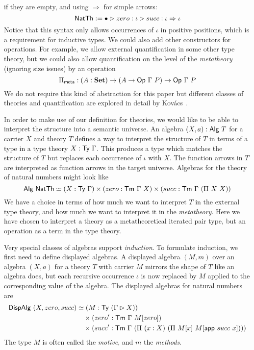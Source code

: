 if they are empty, and using $\Rightarrow$ for simple arrows:
\[
\textsf{NatTh} := \bullet \rhd zero : \iota \rhd succ : \iota \Rightarrow \iota
\]
Notice that this syntax only allows occurrences of $\iota$ in positive
positions, which is a requirement for inductive types.
We could also add other constructors for operations. For example, we allow
external quantification in some other type theory, but we could also allow quantification
on the level of the \emph{metatheory} (ignoring size issues) by an operation
\[
\Pi_{\textsf{meta}} : (A : \mathbf{Set}) \to (A \to \textsf{Op}\ \Gamma\ P) \to \textsf{Op}\ \Gamma\ P
\]
We do not require this kind of abstraction for this paper but different classes of
theories and quantification are explored in detail by Kov\'acs \cite{Kovacs2023-gq}.

In order to make use of our definition for theories, we would like to be able to interpret
the structure into a semantic universe. An algebra $(X, a) : \textsf{Alg}\ T$
for a carrier $X$ and theory $T$ defines a way to interpret the structure of $T$
in terms of a type in a type theory $X : \textsf{Ty}\ \Gamma$. This produces a type which
matches the structure of $T$ but replaces each occurrence of $\iota$ with $X$.
The function arrows in $T$ are interpreted as function arrows in the target universe.
Algebras for the theory of natural numbers might look like
\[
	\mta{Alg}\ \mta{NatTh}\simeq (X : \Ty\ \Gamma) \times (zero : \Tm\ \Gamma\ X) \times (succ : \Tm\ \Gamma\ (\Pi\ X\ X))
\]
We have a choice in terms of how much we want to interpret $T$ in the external type theory,
and how much we want to interpret it in the \emph{metatheory}. Here we have chosen to interpret
a theory as a metatheoretical iterated pair type, but an operation as a term in the type theory.

Very special classes of algebras support \emph{induction}.
To formulate induction, we first need to define displayed algebras.
A displayed algebra $(M, m)$ over an algebra $(X, a)$ for a theory $T$ with
carrier $M$ mirrors the shape of $T$ like an algebra does, but each recursive
occurrence $\iota$ is now replaced by $M$ applied to the corresponding value of
the algebra. The displayed algebras for natural numbers are
\begin{align*}
	\mta{DispAlg}\ (X, zero, succ) & \simeq (M : \Ty\ (\Gamma \rhd X))                                                      \\
	                               & \quad \times (zero' : \Tm\ \Gamma\ M[zero])                                            \\
	                               & \quad \times (succ' : \Tm\ \Gamma\ (\Pi\ (x : X)\ (\Pi\ M[x]\ M[\mta{app}\ succ\ x])))
\end{align*}
The type $M$ is often called the \emph{motive}, and $m$ the \emph{methods}.

